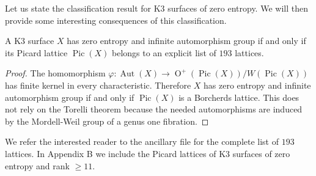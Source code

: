 \documentclass[11pt,letterpaper]{amsart}
\DeclareMathOperator{\rk}{rk}
\DeclareMathOperator{\Aut}{Aut}
\DeclareMathOperator{\Pic}{Pic}
\DeclareMathOperator{\Or}{O}
\begin{document}
Let us state the classification result for K3 surfaces of zero entropy. We will then provide some interesting consequences of this classification.

\begin{theorem} \label{thm:main.theorem.K3}
A K3 surface $X$ has zero entropy and infinite automorphism group if and only if its Picard lattice $\Pic(X)$ belongs to an explicit list of $193$ lattices.
\end{theorem}
\begin{proof}
The homomorphism $\varphi \colon \Aut(X) \to \Or^+(\Pic(X))/W(\Pic(X))$ has finite kernel in every characteristic. Therefore $X$ has zero entropy and infinite automorphism group if and only if $\Pic(X)$ is a Borcherds lattice. 
This does not rely on the Torelli theorem because the needed automorphisms are induced by the Mordell-Weil group of a genus one fibration.  
\end{proof}

We refer the interested reader to the ancillary file for the complete list of $193$ lattices. In Appendix B we include the Picard lattices of K3 surfaces of zero entropy and rank $\ge 11$.


\end{document}
